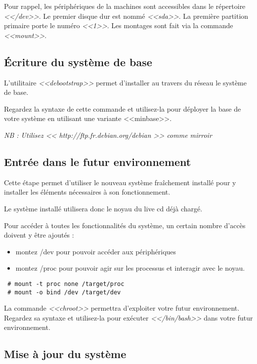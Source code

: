 \documentclass[11pt]{article}
\begin{document}
Pour rappel, les périphériques de la machines sont accessibles dans le
répertoire \emph{<</dev>>}. Le premier disque dur est nommé \emph{<<sda>>}. La
première partition primaire porte le numéro \emph{<<1>>}. Les montages sont
fait via la commande \emph{<<mount>>}.

\subsection{Écriture du système de base}

L'utilitaire \emph{<<debootstrap>>} permet d'installer au travers du réseau le
système de base.

Regardez la syntaxe de cette commande et utilisez-la pour déployer la base de
votre système en utilisant une variante <<minbase>>.

\emph{NB : Utilisez << http://ftp.fr.debian.org/debian >> comme mirroir}

\subsection{Entrée dans le futur environnement}

Cette étape permet d'utiliser le nouveau système fraîchement installé pour y
installer les éléments nécessaires à son fonctionnement.

Le système installé utilisera donc le noyau du live cd déjà chargé.

Pour accéder à toutes les fonctionnalités du système, un certain nombre d'accès
doivent y être ajoutés :

\begin{itemize}
 \item montez /dev pour pouvoir accéder aux périphériques
 \item montez /proc pour pouvoir agir sur les processus et interagir avec le
noyau.
\end{itemize}

\begin{verbatim}
 # mount -t proc none /target/proc
 # mount -o bind /dev /target/dev
\end{verbatim}

La commande \emph{<<chroot>>} permettra d'exploiter votre futur environnement.
Regardez sa syntaxe et utilisez-la pour exécuter \emph{<</bin/bash>>} dans
votre futur environnement.

\subsection{Mise à jour du système}
\end{document}
